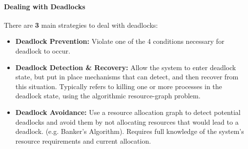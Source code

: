 \documentclass[openany,12pt]{book}
\begin{document}
\paragraph{Dealing with Deadlocks} There are \textbf{3} main strategies to deal with deadlocks:
\begin{itemize}
  \item \textbf{Deadlock Prevention:} Violate one of the 4 conditions necessary for deadlock to occur.

  \item \textbf{Deadlock Detection \& Recovery:} Allow the system to enter deadlock state, but put in place mechanisms that can detect, and then recover from this situation. Typically refers to killing one or more processes in the deadlock state, using the algorithmic resource-graph problem.

  \item \textbf{Deadlock Avoidance:} Use a resource allocation graph to detect potential deadlocks and avoid them by not allocating resources that would lead to a deadlock. (e.g. Banker's Algorithm). Requires full knowledge of the system's resource requirements and current allocation.
\end{itemize}
\end{document}
